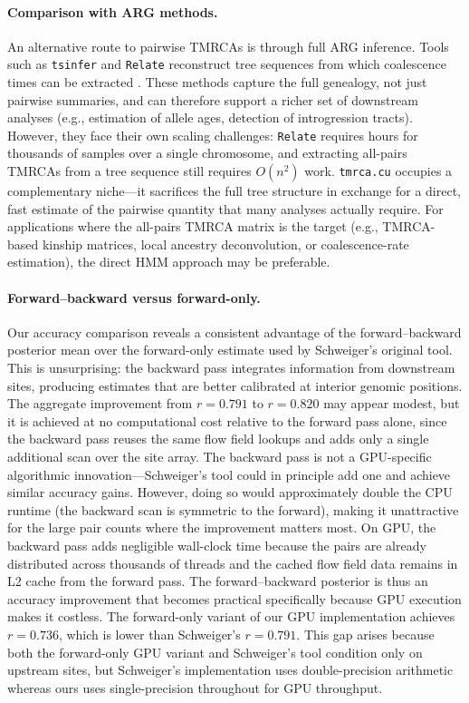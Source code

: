 \documentclass[10pt,letterpaper]{article}
\begin{document}
\paragraph{Comparison with ARG methods.}
An alternative route to pairwise TMRCAs is through full ARG inference.
Tools such as \texttt{tsinfer} and \texttt{Relate} reconstruct tree sequences from which coalescence times can be extracted \cite{Kelleher2019,Speidel2019}.
These methods capture the full genealogy, not just pairwise summaries, and can therefore support a richer set of downstream analyses (e.g., estimation of allele ages, detection of introgression tracts).
However, they face their own scaling challenges: \texttt{Relate} requires hours for thousands of samples over a single chromosome, and extracting all-pairs TMRCAs from a tree sequence still requires $O(n^2)$ work.
\texttt{tmrca.cu} occupies a complementary niche---it sacrifices the full tree structure in exchange for a direct, fast estimate of the pairwise quantity that many analyses actually require.
For applications where the all-pairs TMRCA matrix is the target (e.g., TMRCA-based kinship matrices, local ancestry deconvolution, or coalescence-rate estimation), the direct HMM approach may be preferable.

\paragraph{Forward--backward versus forward-only.}
Our accuracy comparison reveals a consistent advantage of the forward--backward posterior mean over the forward-only estimate used by Schweiger's original tool.
This is unsurprising: the backward pass integrates information from downstream sites, producing estimates that are better calibrated at interior genomic positions.
The aggregate improvement from $r=0.791$ to $r=0.820$ may appear modest, but it is achieved at no computational cost relative to the forward pass alone, since the backward pass reuses the same flow field lookups and adds only a single additional scan over the site array.
The backward pass is not a GPU-specific algorithmic innovation---Schweiger's tool could in principle add one and achieve similar accuracy gains.
However, doing so would approximately double the CPU runtime (the backward scan is symmetric to the forward), making it unattractive for the large pair counts where the improvement matters most.
On GPU, the backward pass adds negligible wall-clock time because the pairs are already distributed across thousands of threads and the cached flow field data remains in L2 cache from the forward pass.
The forward--backward posterior is thus an accuracy improvement that becomes practical specifically because GPU execution makes it costless.
The forward-only variant of our GPU implementation achieves $r=0.736$, which is lower than Schweiger's $r=0.791$.  This gap arises because both the forward-only GPU variant and Schweiger's tool condition only on upstream sites, but Schweiger's implementation uses double-precision arithmetic whereas ours uses single-precision throughout for GPU throughput.
\end{document}
